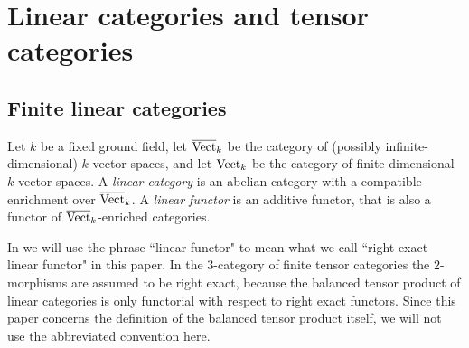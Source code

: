 \documentclass{amsart}
\begin{document}


\section{Linear categories and tensor categories} \label{sec:tc-lincat}

\subsection{Finite linear categories}

	Let $k$ be a fixed ground field, let $\overline{\mathrm{Vect}}_k$ be the category of (possibly infinite-dimensional) $k$-vector spaces, and let $\mathrm{Vect}_k$ be the category of finite-dimensional $k$-vector spaces.   A {\em linear category} is an abelian category with a compatible enrichment over $\overline{\mathrm{Vect}}_k$. 
A {\em linear functor} is an additive functor, that is also a functor of $\overline{\mathrm{Vect}}_k$-enriched categories. 

\begin{warning}
	In \cite{3TC, DTCI} we will use the phrase ``linear functor" to mean what we call ``right exact linear functor" in this paper.  In the $3$-category of finite tensor categories the $2$-morphisms are assumed to be right exact, because the balanced tensor product of linear categories is only functorial with respect to right exact functors.  Since this paper concerns the definition of the balanced tensor product itself, we will not use the abbreviated convention here.
\end{warning}
\end{document}
